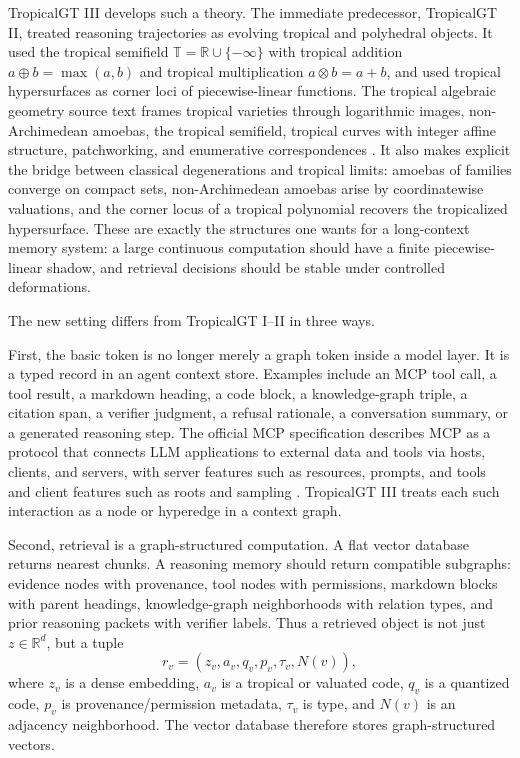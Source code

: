\documentclass[11pt]{article}
\theoremstyle{definition}
\theoremstyle{remark}
\newcommand{\T}{\mathbb{T}}
\newcommand{\R}{\mathbb{R}}
\newcommand{\oplusT}{\oplus}
\newcommand{\otimesT}{\otimes}
\begin{document}
TropicalGT III develops such a theory. The immediate predecessor, TropicalGT II, treated reasoning trajectories as evolving tropical and polyhedral objects. It used the tropical semifield \(\T=\R\cup\{-\infty\}\) with tropical addition \(a\oplusT b=\max(a,b)\) and tropical multiplication \(a\otimesT b=a+b\), and used tropical hypersurfaces as corner loci of piecewise-linear functions. The tropical algebraic geometry source text frames tropical varieties through logarithmic images, non-Archimedean amoebas, the tropical semifield, tropical curves with integer affine structure, patchworking, and enumerative correspondences \cite{ItenbergMikhalkinShustin}. It also makes explicit the bridge between classical degenerations and tropical limits: amoebas of families converge on compact sets, non-Archimedean amoebas arise by coordinatewise valuations, and the corner locus of a tropical polynomial recovers the tropicalized hypersurface. These are exactly the structures one wants for a long-context memory system: a large continuous computation should have a finite piecewise-linear shadow, and retrieval decisions should be stable under controlled deformations.

The new setting differs from TropicalGT I--II in three ways.

First, the basic token is no longer merely a graph token inside a model layer. It is a typed record in an agent context store. Examples include an MCP tool call, a tool result, a markdown heading, a code block, a knowledge-graph triple, a citation span, a verifier judgment, a refusal rationale, a conversation summary, or a generated reasoning step. The official MCP specification describes MCP as a protocol that connects LLM applications to external data and tools via hosts, clients, and servers, with server features such as resources, prompts, and tools and client features such as roots and sampling \cite{MCP2025}. TropicalGT III treats each such interaction as a node or hyperedge in a context graph.

Second, retrieval is a graph-structured computation. A flat vector database returns nearest chunks. A reasoning memory should return compatible subgraphs: evidence nodes with provenance, tool nodes with permissions, markdown blocks with parent headings, knowledge-graph neighborhoods with relation types, and prior reasoning packets with verifier labels. Thus a retrieved object is not just \(z\in\R^d\), but a tuple
\[
    r_v=(z_v, a_v, q_v, p_v, \tau_v, N(v)),
\]
where \(z_v\) is a dense embedding, \(a_v\) is a tropical or valuated code, \(q_v\) is a quantized code, \(p_v\) is provenance/permission metadata, \(\tau_v\) is type, and \(N(v)\) is an adjacency neighborhood. The vector database therefore stores graph-structured vectors.
\end{document}
